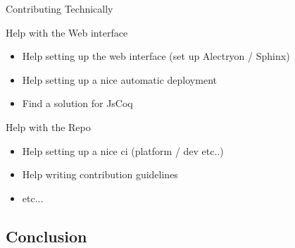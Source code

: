 \documentclass[10pt]{beamer}
\begin{document}
\begin{frame}{Contributing Technically}
  \begin{tcbProp}{Help with the Web interface}
    \begin{itemize}[label=$-$]
      \item Help setting up the web interface (set up Alectryon / Sphinx)
      \item Help setting up a nice automatic deployment
      \item Find a solution for JsCoq
    \end{itemize}
  \end{tcbProp}
  \begin{tcbProp}{Help with the Repo}
    \begin{itemize}[label=$-$]
      \item Help setting up a nice ci (platform / dev etc..)
      \item Help writing contribution guidelines
      \item etc...
    \end{itemize}
  \end{tcbProp}
\end{frame}

\subsection{Conclusion}

\end{document}
